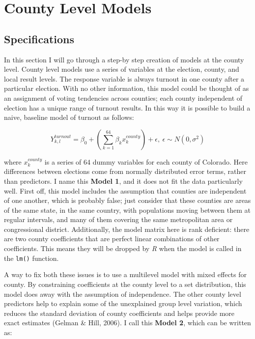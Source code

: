 \documentclass[12pt,twoside]{reedthesis}
\begin{document}
  \section{County Level Models}\label{county-level-models}
  
  \subsection{Specifications}\label{specifications}
  
  In this section I will go through a step-by step creation of models at
  the county level. County level models use a series of variables at the
  election, county, and local result levels. The response variable is
  always turnout in one county after a particular election. With no other
  information, this model could be thought of as an assignment of voting
  tendencies across counties; each county independent of election has a
  unique range of turnout results. In this way it is possible to build a
  naive, baseline model of turnout as follows:
  
  \begin{equation} \tag{Model 1}
  Y^{turnout}_{k,l} = \beta_0 + (\sum_{k=1}^{64}\beta_kx_k^{county}) + \epsilon,\ \epsilon \sim N(0,\sigma^2)
  \end{equation}
  
  where \(x_k^{county}\) is a series of 64 dummy variables for each county
  of Colorado. Here differences between elections come from normally
  distributed error terms, rather than predictors. I name this
  \textbf{Model 1}, and it does not fit the data particularly well. First
  off, this model includes the assumption that counties are independent of
  one another, which is probably false; just consider that these counties
  are areas of the same state, in the same country, with populations
  moving between them at regular intervals, and many of them covering the
  same metropolitan area or congressional district. Additionally, the
  model matrix here is rank deficient: there are two county coefficients
  that are perfect linear combinations of other coefficients. This means
  they will be dropped by \textit{R} when the model is called in the
  \texttt{lm()} function.
  
  A way to fix both these issues is to use a multilevel model with mixed
  effects for county. By constraining coefficients at the county level to
  a set distribution, this model does away with the assumption of
  independence. The other county level predictors help to explain some of
  the unexplained group level variation, which reduces the standard
  deviation of county coefficients and helps provide more exact estimates
  (Gelman \& Hill, 2006). I call this \textbf{Model 2}, which can be
  written as:
  
\end{document}
